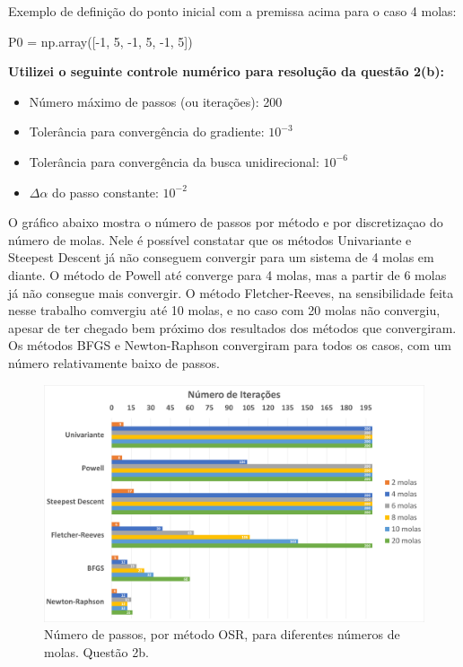 \documentclass[10pt, a4paper]{article}
\begin{document}
Exemplo de definição do ponto inicial com a premissa acima para o caso 4 molas:

\begin{python}
  P0 = np.array([-1, 5, -1, 5, -1, 5])
\end{python}

\textbf{Utilizei o seguinte controle numérico para resolução da questão 2(b):}
\begin{itemize}
  \item Número máximo de passos (ou iterações): 200
  \item Tolerância para convergência do gradiente: $10^{-3}$
  \item Tolerância para convergência da busca unidirecional: $10^{-6}$
  \item $\Delta\alpha$ do passo constante: $10^{-2}$
\end{itemize}

O gráfico abaixo mostra o número de passos por método e por discretizaçao do número de molas. Nele é possível
constatar que os métodos Univariante e Steepest Descent já não conseguem convergir para um sistema de 4 molas em diante.
O método de Powell até converge para 4 molas, mas a partir de 6 molas já não consegue mais convergir. O método Fletcher-Reeves,
na sensibilidade feita nesse trabalho comvergiu até 10 molas, e no caso com 20 molas não convergiu, apesar de ter chegado
bem próximo dos resultados dos métodos que convergiram. Os métodos BFGS e
Newton-Raphson convergiram para todos os casos, com um número relativamente baixo de passos.

\begin{figure}[H]
  \centering
  \includegraphics[scale=0.35]{figuras/q2b_passos.png}
  \caption{Número de passos, por método OSR, para diferentes números de molas. Questão 2b.}
\end{figure}
\end{document}
